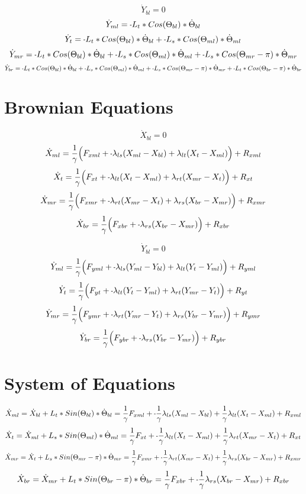 \documentclass[11pt, landscape]{article}
\newcommand{\mn}{\scalebox{0.7}[1.0]{-}}
\begin{document}
$$\dot{Y}_{bl} = 0$$                                                               
$$\dot{Y}_{ml} = \mn L_{t}*Cos(\Theta_{bl}) * \dot{\Theta}_{bl}$$
$$\dot{Y}_{t}  = \mn L_{t}*Cos(\Theta_{bl}) * \dot{\Theta}_{bl} + \mn L_{s}*Cos(\Theta_{ml}) * \dot{\Theta}_{ml}$$
$$\dot{Y}_{mr} = \mn L_{t}*Cos(\Theta_{bl}) * \dot{\Theta}_{bl} + \mn L_{s}*Cos(\Theta_{ml}) * \dot{\Theta}_{ml} + \mn L_{s}*Cos(\Theta_{mr}-\pi) * \dot{\Theta}_{mr}$$
$$\dot{Y}_{br} = \mn L_{t}*Cos(\Theta_{bl}) * \dot{\Theta}_{bl} + \mn L_{s}*Cos(\Theta_{ml}) * \dot{\Theta}_{ml} + \mn L_{s}*Cos(\Theta_{mr}-\pi) * \dot{\Theta}_{mr} + \mn L_{t}*Cos(\Theta_{br}-\pi) * \dot{\Theta}_{br}$$

\section{Brownian Equations}
$$\dot{X}_{bl} = 0$$
$$\dot{X}_{ml} = \frac{1}{\gamma} \Big(F_{xml} + \mn \lambda_{ls}(X_{ml} - X_{bl}) + \lambda_{lt}(X_{t } - X_{ml}) \Big) + R_{xml}$$
$$\dot{X}_{t } = \frac{1}{\gamma} \Big(F_{xt } + \mn \lambda_{lt}(X_{t } - X_{ml}) + \lambda_{rt}(X_{mr} - X_{t }) \Big) + R_{xt }$$
$$\dot{X}_{mr} = \frac{1}{\gamma} \Big(F_{xmr} + \mn \lambda_{rt}(X_{mr} - X_{t }) + \lambda_{rs}(X_{br} - X_{mr}) \Big) + R_{xmr}$$
$$\dot{X}_{br} = \frac{1}{\gamma} \Big(F_{xbr} + \mn \lambda_{rs}(X_{br} - X_{mr})                                 \Big) + R_{xbr}$$

$$\dot{Y}_{bl} = 0$$
$$\dot{Y}_{ml} = \frac{1}{\gamma} \Big(F_{yml} + \mn \lambda_{ls}(Y_{ml} - Y_{bl}) + \lambda_{lt}(Y_{t } - Y_{ml}) \Big) + R_{yml}$$
$$\dot{Y}_{t}  = \frac{1}{\gamma} \Big(F_{yt } + \mn \lambda_{lt}(Y_{t } - Y_{ml}) + \lambda_{rt}(Y_{mr} - Y_{t }) \Big) + R_{yt }$$
$$\dot{Y}_{mr} = \frac{1}{\gamma} \Big(F_{ymr} + \mn \lambda_{rt}(Y_{mr} - Y_{t }) + \lambda_{rs}(Y_{br} - Y_{mr}) \Big) + R_{ymr}$$
$$\dot{Y}_{br} = \frac{1}{\gamma} \Big(F_{ybr} + \mn \lambda_{rs}(Y_{br} - Y_{mr})                                 \Big) + R_{ybr}$$

\section{System of Equations}

$$\dot{X}_{ml} = \dot{X}_{bl} + L_{t}*Sin(\Theta_{bl})     * \dot{\Theta}_{bl} = \frac{1}{\gamma}F_{xml} + \mn\frac{1}{\gamma}\lambda_{ls}(X_{ml} - X_{bl}) + \frac{1}{\gamma}\lambda_{lt}(X_{t } - X_{ml}) + R_{xml}$$
$$\dot{X}_{t} = \dot{X}_{ml} + L_{s}*Sin(\Theta_{ml})     * \dot{\Theta}_{ml} = \frac{1}{\gamma}F_{xt } + \mn\frac{1}{\gamma}\lambda_{lt}(X_{t } - X_{ml}) + \frac{1}{\gamma}\lambda_{rt}(X_{mr} - X_{t }) + R_{xt }$$
$$\dot{X}_{mr} = \dot{X}_{t } + L_{s}*Sin(\Theta_{mr}-\pi) * \dot{\Theta}_{mr} = \frac{1}{\gamma}F_{xmr} + \mn\frac{1}{\gamma}\lambda_{rt}(X_{mr} - X_{t }) + \frac{1}{\gamma}\lambda_{rs}(X_{br} - X_{mr}) + R_{xmr}$$
$$\dot{X}_{br} = \dot{X}_{mr} + L_{t}*Sin(\Theta_{br}-\pi) * \dot{\Theta}_{br} = \frac{1}{\gamma}F_{xbr} + \mn\frac{1}{\gamma}\lambda_{rs}(X_{br} - X_{mr}) + R_{xbr}$$
\end{document}
